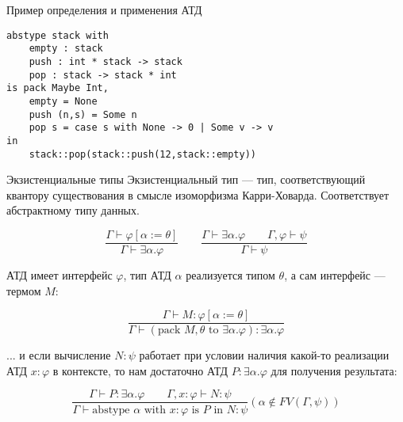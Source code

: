 \documentclass[aspectratio=169]{beamer}
\begin{document}
\begin{frame}[fragile]{Пример определения и применения АТД}
\begin{verbatim}
abstype stack with 
    empty : stack
    push : int * stack -> stack
    pop : stack -> stack * int
is pack Maybe Int,
    empty = None
    push (n,s) = Some n
    pop s = case s with None -> 0 | Some v -> v
in
    stack::pop(stack::push(12,stack::empty))
\end{verbatim}
\end{frame}

\begin{frame}{Экзистенциальные типы}
	Экзистенциальный тип --- тип, соответствующий квантору существования в смысле изоморфизма Карри-Ховарда.
	Соответствует абстрактному типу данных.

	 $$\dfrac{\Gamma\vdash\varphi[\alpha:=\theta]}{\Gamma\vdash\exists\alpha.\varphi}\quad\quad
	  \dfrac{\Gamma\vdash\exists\alpha.\varphi\qquad\Gamma,\varphi\vdash\psi}{\Gamma\vdash\psi}$$

	АТД имеет интерфейс $\varphi$, тип АТД $\alpha$ реализуется типом $\theta$, а сам интерфейс --- термом $M$:

	$$\dfrac{\Gamma \vdash M : \varphi[\alpha := \theta]}{\Gamma\vdash (\text{pack } M, \theta \text{ to } \exists \alpha . \varphi) : \exists \alpha.\varphi}$$

	... и если вычисление $N:\psi$ работает при условии наличия какой-то реализации АТД $x:\varphi$ в контексте, то нам достаточно
	АТД $P:\exists\alpha.\varphi$ для получения результата:

	$$\dfrac{\Gamma \vdash P : \exists \alpha . \varphi\qquad\Gamma, x : \varphi \vdash N : \psi}{\Gamma \vdash \text{abstype } \alpha \text{ with } x:\varphi \text{ is } P \text{ in } N:\psi}
	(\alpha \notin FV(\Gamma, \psi))$$


	 
\end{frame}
	 
\end{document}
